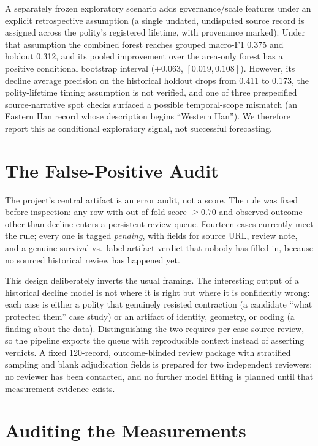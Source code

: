 \documentclass[conference]{IEEEtran}
\begin{document}
A separately frozen exploratory scenario adds governance/scale features under an
explicit retrospective assumption (a single undated, undisputed source record is
assigned across the polity's registered lifetime, with provenance marked). Under
that assumption the combined forest reaches grouped macro-F1 0.375 and holdout
0.312, and its pooled improvement over the area-only forest has a positive
conditional bootstrap interval ($+0.063$, $[0.019, 0.108]$). However, its decline
average precision on the historical holdout drops from 0.411 to 0.173, the
polity-lifetime timing assumption is not verified, and one of three prespecified
source-narrative spot checks surfaced a possible temporal-scope mismatch (an
Eastern Han record whose description begins ``Western Han''). We therefore report
this as conditional exploratory signal, not successful forecasting.

\section{The False-Positive Audit}
\label{sec:fp}
The project's central artifact is an error audit, not a score. The rule was fixed
before inspection: any row with out-of-fold score $\geq 0.70$ and observed outcome
other than decline enters a persistent review queue. Fourteen cases currently meet
the rule; every one is tagged \emph{pending}, with fields for source URL, review
note, and a genuine-survival vs.\ label-artifact verdict that nobody has filled
in, because no sourced historical review has happened yet.

This design deliberately inverts the usual framing. The interesting output of a
historical decline model is not where it is right but where it is confidently
wrong: each case is either a polity that genuinely resisted contraction (a
candidate ``what protected them'' case study) or an artifact of identity, geometry,
or coding (a finding about the data). Distinguishing the two requires per-case
source review, so the pipeline exports the queue with reproducible context instead
of asserting verdicts. A fixed 120-record, outcome-blinded review package with
stratified sampling and blank adjudication fields is prepared for two independent
reviewers; no reviewer has been contacted, and no further model fitting is planned
until that measurement evidence exists.

\section{Auditing the Measurements}
\label{sec:measurements}
\end{document}
